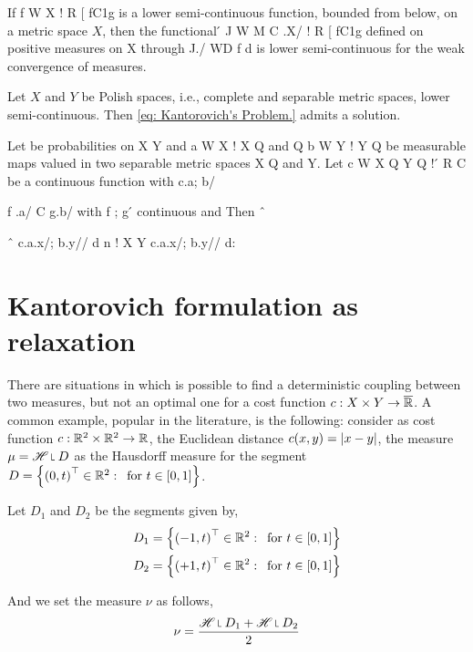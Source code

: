 \begin{theorem}
	If f W X ! R [ fC1g is a lower semi-continuous function, bounded
	from below, on a metric space $X$, then the functional
	́ J W M C .X/ ! R [ fC1g
	defined on positive measures on X through J./ WD f d is lower semi-continuous
	for the weak convergence of measures.
\end{theorem}

\begin{theorem}
Let $X$ and $Y$ be Polish spaces, i.e., complete and separable metric spaces, lower semi-continuous. Then \eqref{eq: Kantorovich's Problem.} admits a solution.
\end{theorem}

\begin{theorem}
	Let be probabilities on X Y and a W X ! X Q and
	Q
	b W Y ! Y Q be measurable maps valued in two separable metric spaces X Q and Y.
	Let c W X Q Y Q !  ́ R C be a continuous
	function
	with
	c.a;
	b/

	f
	.a/
	C
	g.b/
	with
	f
	;
	g
	́
	continuous and  Then
	ˆ

	ˆ
	c.a.x/; b.y// d n !
	X Y
	c.a.x/; b.y// d:
\end{theorem}

\section{Kantorovich formulation as relaxation}

There are situations in which is possible to find a deterministic coupling between two measures, but not an optimal one for a cost function $c:X\times Y \rightarrow \overline{\mathbb{R}}$. A common example, popular in the literature, is the following: consider as cost function $c:\mathbb{R}^2\times\mathbb{R}^2 \rightarrow \mathbb{R}$, the Euclidean distance $c(x,y)=\left| x-y \right|$, the measure $\mu=\Hausdorff\measurerestr D$ as the Hausdorff measure for the segment  $D=\left\lbrace \left( 0, t \right)^\top \in \mathbb{R}^2:\, \text{ for } t\in [0,1] \right\rbrace$. 

Let $D_1$ and $D_2$ be the segments given by,
\begin{align*}
D_1 = \left\lbrace \left( -1, t \right)^\top\in\mathbb{R}^2:\, \text{ for } t\in [0,1] \right\rbrace \\
D_2 = \left\lbrace \left( +1, t \right)^\top\in\mathbb{R}^2:\, \text{ for } t\in [0,1] \right\rbrace
\end{align*}

And we set the measure $\nu$ as follows, 
\begin{equation*}
\nu=\frac{\Hausdorff\measurerestr D_1 + \Hausdorff \measurerestr D_2}{2}
\end{equation*}

